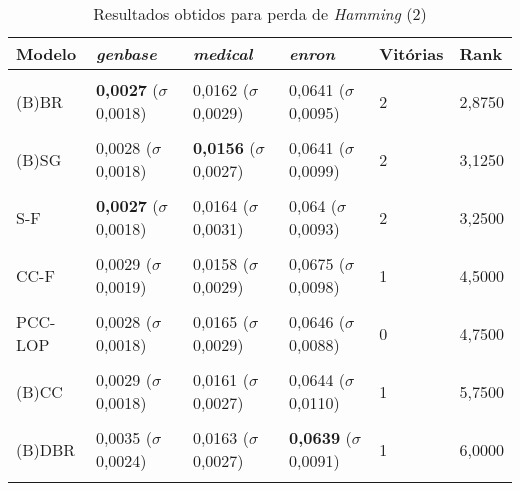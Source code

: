 \begin{table}[htbp]
	\centering
	\caption{Resultados obtidos para perda de \textit{{Hamming}} (2)}
		\begin{tabular}
        { p{0.88in} p{0.88in} p{0.88in} p{0.88in} p{0.88in} p{0.88in} }
        
        \hline
Modelo & \textit{genbase} & \textit{medical} & \textit{enron} & \textbf{Vitórias} & \textbf{Rank} \\ 
\hline \\

(B)BR & \textbf{0,0027} \newline ($\sigma$ 0,0018) & 0,0162 \newline ($\sigma$ 0,0029) & 0,0641 \newline ($\sigma$ 0,0095) & 2 & 2,8750 \\ \\
(B)SG & 0,0028 \newline ($\sigma$ 0,0018) & \textbf{0,0156} \newline ($\sigma$ 0,0027) & 0,0641 \newline ($\sigma$ 0,0099) & 2 & 3,1250 \\ \\
S-F & \textbf{0,0027} \newline ($\sigma$ 0,0018) & 0,0164 \newline ($\sigma$ 0,0031) & 0,064 \newline ($\sigma$ 0,0093) & 2 & 3,2500 \\ \\
CC-F & 0,0029 \newline ($\sigma$ 0,0019) & 0,0158 \newline ($\sigma$ 0,0029) & 0,0675 \newline ($\sigma$ 0,0098) & 1 & 4,5000 \\ \\
PCC-LOP & 0,0028 \newline ($\sigma$ 0,0018) & 0,0165 \newline ($\sigma$ 0,0029) & 0,0646 \newline ($\sigma$ 0,0088) & 0 & 4,7500 \\ \\
(B)CC & 0,0029 \newline ($\sigma$ 0,0018) & 0,0161 \newline ($\sigma$ 0,0027) & 0,0644 \newline ($\sigma$ 0,0110) & 1 & 5,7500 \\ \\
(B)DBR & 0,0035 \newline ($\sigma$ 0,0024) & 0,0163 \newline ($\sigma$ 0,0027) & \textbf{0,0639} \newline ($\sigma$ 0,0091) & 1 & 6,0000 \\ \\

\end{tabular}
\end{table}
